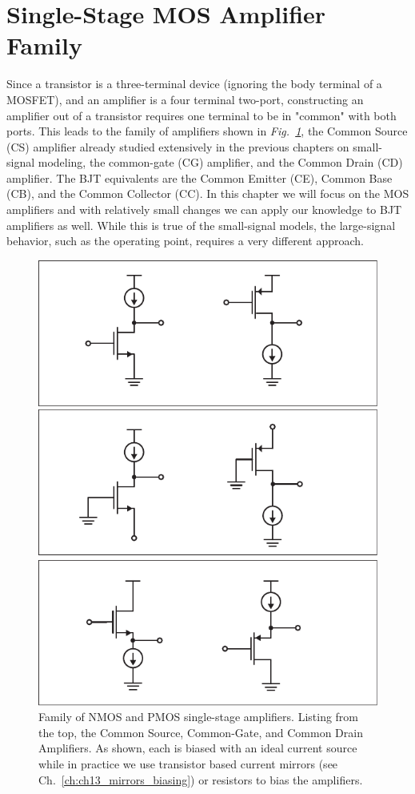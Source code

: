 \section{Single-Stage MOS Amplifier Family}
Since a transistor is a three-terminal device (ignoring the body terminal of a MOSFET), and an amplifier is a four terminal two-port, constructing an amplifier out of a transistor requires one terminal to be in "common" with both ports.  This leads to the family of amplifiers shown in \emph{Fig.~\ref{fig:ampchart}}, the Common Source (CS) amplifier already studied extensively in the previous chapters on small-signal modeling, the common-gate (CG) amplifier, and the Common Drain (CD) amplifier.  The BJT equivalents are the Common Emitter (CE), Common Base (CB), and the Common Collector (CC).  In this chapter we will focus on the MOS amplifiers and with relatively small changes we can apply our knowledge to BJT amplifiers as well.  While this is true of the small-signal models, the large-signal behavior, such as the operating point, requires a very different approach.
\begin{figure}[tb]
\centering
\includegraphics[scale=.75]{ampchart}
\caption{Family of NMOS and PMOS single-stage amplifiers.  Listing from the top, the Common Source, Common-Gate, and Common Drain Amplifiers.  As shown, each is biased with an ideal current source while in practice we use transistor based current mirrors (see Ch.~\ref{ch:ch13_mirrors_biasing}) or resistors to bias the amplifiers.}
\label{fig:ampchart}
\end{figure}
